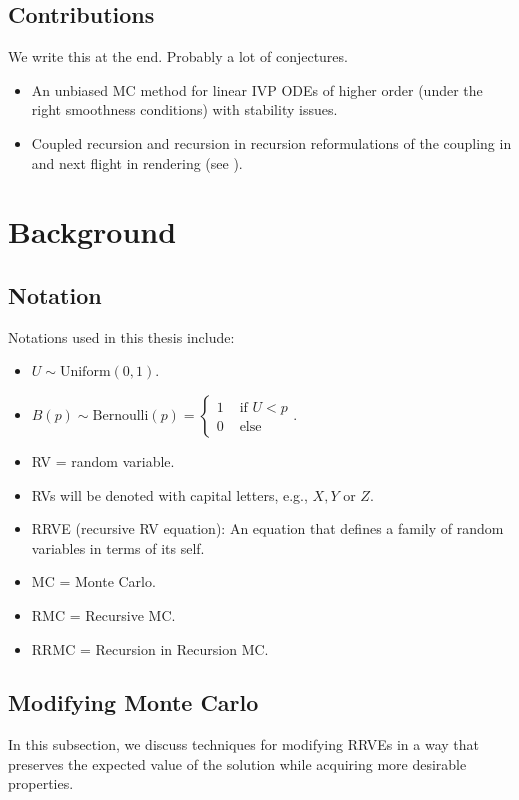 \documentclass[a4paper,12pt]{article}
\begin{document}
\subsection{Contributions}
We write this at the end. Probably a lot of conjectures.\\

\begin{itemize}
    \item An unbiased MC method for linear IVP ODEs of higher order (under
          the right smoothness conditions) with stability issues.
    \item Coupled recursion and recursion in recursion reformulations of the coupling in
          \cite{vicini_path_2021} and next flight in rendering (see \cite{sawhney_grid-free_2022}).
\end{itemize}



\section{Background}

\subsection{Notation}
Notations used in this thesis include:

\begin{itemize}
    \item $U \sim \text{Uniform}(0,1)$.
    \item $B(p) \sim \text{Bernoulli}(p) =
              \begin{cases}
                  1 & \text{ if } U<p \\
                  0 & \text{ else }
              \end{cases}. $
    \item RV = random variable.
    \item RVs will be denoted with capital letters, e.g., $X,Y$ or $Z$.
    \item RRVE (recursive RV equation): An equation that defines a
          family of random variables in terms of its self.
    \item MC = Monte Carlo.
    \item RMC = Recursive MC.
    \item RRMC = Recursion in Recursion MC.
\end{itemize}


\subsection{Modifying Monte Carlo}
In this subsection, we discuss techniques for modifying RRVEs
in a way that preserves the expected value of the solution while
acquiring more desirable properties. \\
\end{document}
